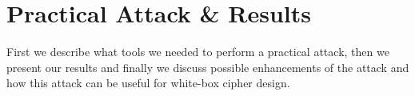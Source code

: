 \chapter{Practical Attack \& Results}
\label{chap:results}

First we describe what tools we needed to perform a practical attack, then we present our results and finally we discuss possible enhancements of the attack and how this attack can be useful for white-box cipher design.








